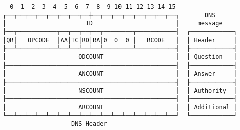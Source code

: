 \documentclass[varwidth=30cm,crop]{standalone}
\begin{document}
\begin{verbatim}
  0  1  2  3  4  5  6  7  8  9 10 11 12 13 14 15     
┌──┬──┬──┬──┬──┬──┬──┬──┼──┬──┬──┬──┬──┬──┬──┬──┐       DNS
│                      ID                       │     message
├──┬───────────┬──┬──┬──┬──┬────────┬───────────┤  ┌────────────┐
│QR│   OPCODE  │AA│TC│RD│RA│0  0  0 │   RCODE   │  │ Header     │
├──┴───────────┴──┴──┴──┴──┴────────┴───────────┤  ├────────────┤
│                    QDCOUNT                    │  │ Question   │
├───────────────────────────────────────────────┤  ├────────────┤
│                    ANCOUNT                    │  │ Answer     │
├───────────────────────────────────────────────┤  ├────────────┤
│                    NSCOUNT                    │  │ Authority  │
├───────────────────────────────────────────────┤  ├────────────┤
│                    ARCOUNT                    │  │ Additional │
└──┴──┴──┴──┴──┴──┴──┴──┴──┴──┴──┴──┴──┴──┴──┴──┘  └────────────┘
                   DNS Header
\end{verbatim}
\end{document}
